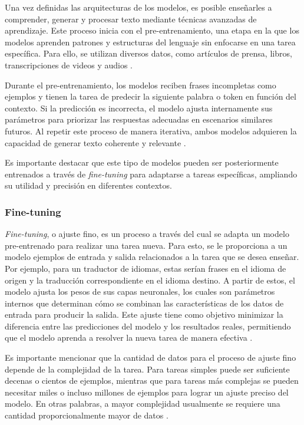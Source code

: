 Una vez definidas las arquitecturas de los modelos, es posible enseñarles a comprender, generar y procesar texto mediante técnicas avanzadas de aprendizaje. Este proceso inicia con el pre-entrenamiento, una etapa en la que los modelos aprenden patrones y estructuras del lenguaje sin enfocarse en una tarea específica. Para ello, se utilizan diversos datos, como artículos de prensa, libros, transcripciones de videos y audios \cite{twentynine}.

Durante el pre-entrenamiento, los modelos reciben frases incompletas como ejemplos y tienen la tarea de predecir la siguiente palabra o token en función del contexto. Si la predicción es incorrecta, el modelo ajusta internamente sus parámetros para priorizar las respuestas adecuadas en escenarios similares futuros. Al repetir este proceso de manera iterativa, ambos modelos adquieren la capacidad de generar texto coherente y relevante \cite{thirtytwo}.  

Es importante destacar que este tipo de modelos pueden ser posteriormente entrenados a través de \textit{fine-tuning} para adaptarse a tareas específicas, ampliando su utilidad y precisión en diferentes contextos.


\subsubsection{Fine-tuning}

\textit{Fine-tuning}, o ajuste fino, es un proceso a través del cual se adapta un modelo pre-entrenado para realizar una tarea nueva. Para esto, se le proporciona a un modelo ejemplos de entrada y salida relacionados a la tarea que se desea enseñar. Por ejemplo, para un traductor de idiomas, estas serían frases en el idioma de origen y la traducción correspondiente en el idioma destino. A partir de estos, el modelo ajusta los pesos de sus capas neuronales, los cuales son parámetros internos que determinan cómo se combinan las características de los datos de entrada para producir la salida. Este ajuste tiene como objetivo minimizar la diferencia entre las predicciones del modelo y los resultados reales, permitiendo que el modelo aprenda a resolver la nueva tarea de manera efectiva \cite{thirtythree}. 

Es importante mencionar que la cantidad de datos para el proceso de ajuste fino depende de la complejidad de la tarea. Para tareas simples puede ser suficiente decenas o cientos de ejemplos, mientras que para tareas más complejas se pueden necesitar miles o incluso millones de ejemplos para lograr un ajuste preciso del modelo. En otras palabras, a mayor complejidad usualmente se requiere una cantidad proporcionalmente mayor de datos \cite{thirtythree}.

